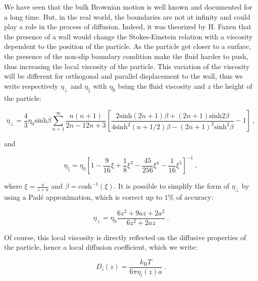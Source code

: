 We have seen that the bulk Brownian motion is well known and documented for a long time. But, in the real world, the boundaries are not at infinity and could play a role in the process of diffusion. Indeed, it was theorized by H. Faxen \cite{faxen_fredholm_1924} that the presence of a wall would change the Stokes-Einstein relation with a viscosity dependent to the position of the particle. As the particle get closer to a surface, the presence of the non-slip boundary condition make the fluid harder to push, thus increasing the local viscosity of the particle. This variation of the viscosity will be different for orthogonal and parallel displacement to the wall, thus we write respectively $\eta_\bot $ and $\eta_\parallel$ with $\eta_0$ being the fluid viscosity and $z$ the height of the particle:

\begin{equation}
	\eta_\bot = \frac{4}{3} \eta_0 \mathrm{sinh}\beta \sum _{n=1} ^{\infty} \frac{n(n+1)}{{2n-1}{2n+3}}
	\left[
	\frac
	{
		2\mathrm{sinh}(2n + 1)\beta + (2n +1)\mathrm{sinh}2\beta
	}
	{
		4\mathrm{sinh}^2(n + 1 /2)\beta  - (2n+1)^2 \mathrm{sinh}^2 \beta
	}
	-1
	\right] ~,
	\label{Eq:etaz}
\end{equation}

and 

\begin{equation}
	\eta_\parallel = \eta_0 
	\left[
	1 - \frac{9}{16} \xi + \frac{1}{8}\xi^3 - \frac{45}{256}\xi^4 - \frac{1}{16}\xi^5
	\right]^{-1}~,
	\label{Eq:etax}
\end{equation}

where $\xi = \frac{a}{z+a}$ and $\beta = \mathrm{cosh}^{-1}(\xi)$. It is possible to simplify the form of $\eta_\bot$ by using a Padé approximation, which is correct up to $1\%$ of accuracy:

\begin{equation}
	\eta_\bot = \eta_0 \frac{6z^2 + 9az + 2a^2}{6z^2 + 2az}~.
\end{equation}

Of course, this local viscosity is directly reflected on the diffusive properties of the particle, hence a local diffusion coefficient, which we write:

\begin{equation}
	D_i (z) = \frac{k_\mathrm{B} T}{6\pi\eta_i (z) a}~.
\end{equation}

